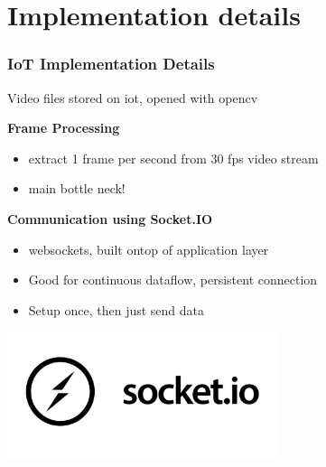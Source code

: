 \documentclass{beamer}
\begin{document}
\section{Implementation details}


\begin{frame}
\frametitle{IoT Implementation Details}
Video files stored on iot, opened with opencv

\textbf{Frame Processing}
\begin{itemize}

    \item extract 1 frame per second from 30 fps video stream
    \item main bottle neck!

    \end{itemize}

\textbf{Communication using Socket.IO}
\begin{itemize}
    \item websockets, built ontop of application layer
    \item Good for continuous dataflow, persistent connection
    \item Setup once, then just send data
\end{itemize}
\begin{center}
    \includegraphics[width=0.6\textwidth]{./res/socket-io-logo-1.jpeg}
\end{center}

\end{frame}
\end{document}
